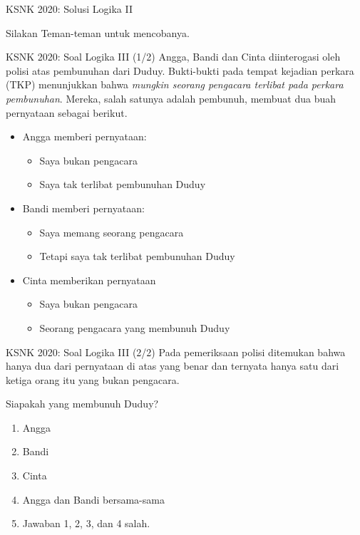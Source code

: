 \documentclass[english,t]{beamer}
\begin{document}
\begin{frame}{KSNK 2020: Solusi Logika II}
	\begin{center}
		Silakan Teman-teman untuk mencobanya.
	\end{center}	
\end{frame}

\begin{frame}{KSNK 2020: Soal Logika III (1/2)}
Angga, Bandi dan Cinta diinterogasi oleh polisi atas pembunuhan dari Duduy. Bukti-bukti pada tempat kejadian perkara (TKP) menunjukkan bahwa \textit{mungkin seorang pengacara terlibat pada perkara pembunuhan}. Mereka, salah satunya adalah pembunuh, membuat dua buah pernyataan sebagai berikut.
\begin{itemize}
	\item Angga memberi pernyataan:
		\begin{itemize}
			\item Saya bukan pengacara
			\item Saya tak terlibat pembunuhan Duduy
		\end{itemize}
	\item Bandi memberi pernyataan:
		\begin{itemize}
			\item Saya memang seorang pengacara
			\item Tetapi saya tak terlibat pembunuhan Duduy
		\end{itemize}
	\item Cinta memberikan pernyataan
		\begin{itemize}
			\item Saya bukan pengacara
			\item Seorang pengacara yang membunuh Duduy
		\end{itemize}
\end{itemize}
\end{frame}

\begin{frame}{KSNK 2020: Soal Logika III (2/2)}
	Pada pemeriksaan polisi ditemukan bahwa hanya dua dari pernyataan di atas yang benar dan ternyata hanya satu dari ketiga orang itu yang bukan pengacara.

	\bigskip
	Siapakah yang membunuh Duduy?
	\begin{enumerate}
		\item Angga
		\item Bandi
		\item Cinta
		\item Angga dan Bandi bersama-sama
		\item Jawaban 1, 2, 3, dan 4 salah.
	\end{enumerate}
\end{frame}
\end{document}
